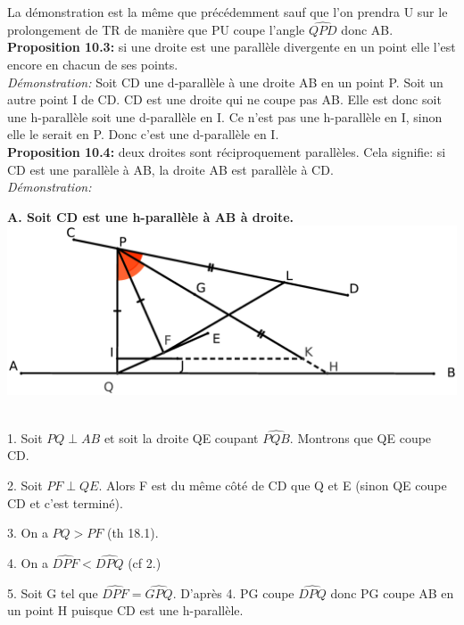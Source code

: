 \documentclass[a4paper, 12pt, twoside]{book}
\begin{document}
 
    La démonstration est la même que précédemment sauf que l'on prendra U sur le prolongement de TR de manière que PU coupe l'angle $\hat{QPD}$ donc AB. \\
    
        \textbf{Proposition 10.3:} si une droite est une parallèle divergente en un point elle l'est encore en chacun de ses points.\\
        
        \textit{Démonstration:} Soit CD une d-parallèle à une droite AB en un point P. Soit un autre point I de CD. CD est une droite qui ne coupe pas AB. Elle est donc soit une h-parallèle soit une d-parallèle en I. Ce n'est pas une h-parallèle en I, sinon elle le serait en P. Donc c'est une d-parallèle en I. \\
        
        \textbf{Proposition 10.4:} deux droites sont réciproquement parallèles. Cela signifie: si CD est une parallèle à AB, la droite AB est parallèle à CD.\\
          
        \textit{Démonstration:} \
        
        \textbf{A. Soit CD est une h-parallèle à AB à droite.} \\
        
  
   \includegraphics[scale=0.2]{figures/Lobat8.eps}\
   
   1. Soit $PQ \perp AB$ et soit la droite QE coupant $\hat{PQB}$. Montrons que QE coupe CD.\
   
   2. Soit $PF \perp QE$. Alors F est du même côté de CD que Q et E (sinon QE coupe CD et c'est terminé).\
   
   3. On a $PQ>PF$ (th 18.1).\
   
   4. On a $\hat{DPF}<\hat{DPQ}$ (cf 2.)\
   
   5. Soit G tel que  $\hat{DPF}=\hat{GPQ}$. D'après 4. PG coupe $\hat{DPQ}$ donc PG coupe AB en un point H puisque CD est une h-parallèle.\
   
\end{document}
